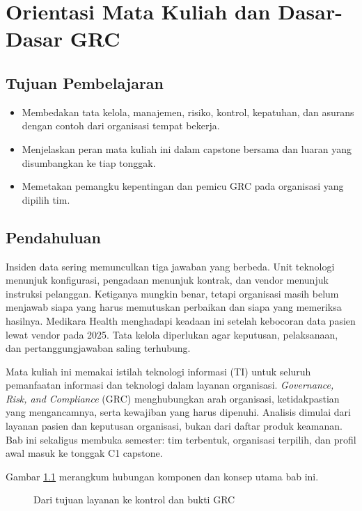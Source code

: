 \chapter{Orientasi Mata Kuliah dan Dasar-Dasar GRC}

\section*{Tujuan Pembelajaran}
\begin{itemize}
  \item Membedakan tata kelola, manajemen, risiko, kontrol, kepatuhan, dan asurans
  dengan contoh dari organisasi tempat bekerja.
  \item Menjelaskan peran mata kuliah ini dalam capstone bersama dan luaran yang
  disumbangkan ke tiap tonggak.
  \item Memetakan pemangku kepentingan dan pemicu GRC pada organisasi yang dipilih tim.
\end{itemize}

\section{Pendahuluan}

Insiden data sering memunculkan tiga jawaban yang berbeda. Unit teknologi menunjuk
konfigurasi, pengadaan menunjuk kontrak, dan vendor menunjuk instruksi pelanggan.
Ketiganya mungkin benar, tetapi organisasi masih belum menjawab siapa yang harus
memutuskan perbaikan dan siapa yang memeriksa hasilnya. Medikara Health menghadapi
keadaan ini setelah kebocoran data pasien lewat vendor pada 2025. Tata kelola diperlukan
agar keputusan, pelaksanaan, dan pertanggungjawaban saling terhubung.

Mata kuliah ini memakai istilah teknologi informasi (TI) untuk seluruh pemanfaatan
informasi dan teknologi dalam layanan organisasi. \textit{Governance, Risk, and Compliance}
(GRC) menghubungkan arah organisasi, ketidakpastian yang mengancamnya, serta kewajiban
yang harus dipenuhi. Analisis dimulai dari layanan pasien dan keputusan organisasi, bukan
dari daftar produk keamanan. Bab ini sekaligus membuka semester: tim terbentuk, organisasi
terpilih, dan profil awal masuk ke tonggak C1 capstone.

Gambar \ref{fig:ch01-ilustrasi-bab} merangkum hubungan komponen dan konsep utama bab ini.
\begin{figure}[!htb]
  \centering
  
  \caption{Dari tujuan layanan ke kontrol dan bukti GRC}
  \label{fig:ch01-ilustrasi-bab}
\end{figure}


